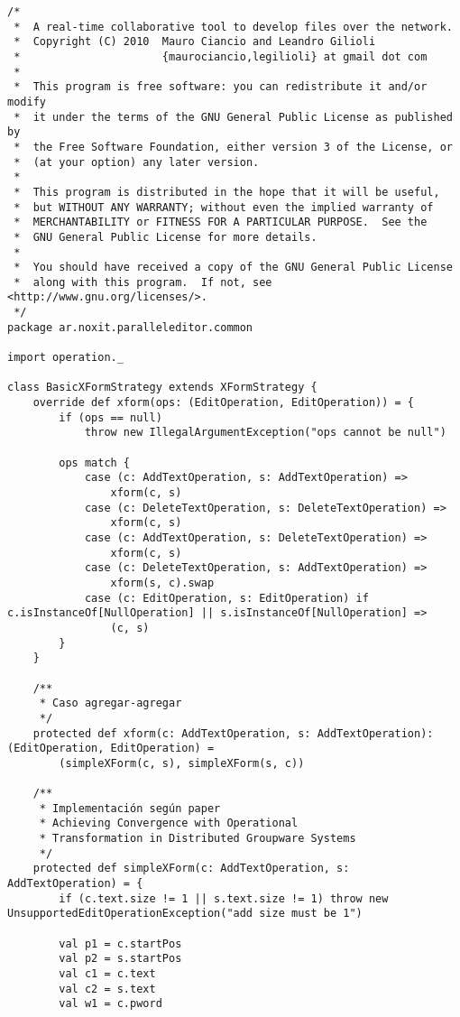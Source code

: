{
\tiny
\begin{verbatim}
/*
 *  A real-time collaborative tool to develop files over the network.
 *  Copyright (C) 2010  Mauro Ciancio and Leandro Gilioli
 *                      {maurociancio,legilioli} at gmail dot com
 *
 *  This program is free software: you can redistribute it and/or modify
 *  it under the terms of the GNU General Public License as published by
 *  the Free Software Foundation, either version 3 of the License, or
 *  (at your option) any later version.
 *
 *  This program is distributed in the hope that it will be useful,
 *  but WITHOUT ANY WARRANTY; without even the implied warranty of
 *  MERCHANTABILITY or FITNESS FOR A PARTICULAR PURPOSE.  See the
 *  GNU General Public License for more details.
 *
 *  You should have received a copy of the GNU General Public License
 *  along with this program.  If not, see <http://www.gnu.org/licenses/>.
 */
package ar.noxit.paralleleditor.common

import operation._

class BasicXFormStrategy extends XFormStrategy {
    override def xform(ops: (EditOperation, EditOperation)) = {
        if (ops == null)
            throw new IllegalArgumentException("ops cannot be null")

        ops match {
            case (c: AddTextOperation, s: AddTextOperation) =>
                xform(c, s)
            case (c: DeleteTextOperation, s: DeleteTextOperation) =>
                xform(c, s)
            case (c: AddTextOperation, s: DeleteTextOperation) =>
                xform(c, s)
            case (c: DeleteTextOperation, s: AddTextOperation) =>
                xform(s, c).swap
            case (c: EditOperation, s: EditOperation) if c.isInstanceOf[NullOperation] || s.isInstanceOf[NullOperation] =>
                (c, s)
        }
    }

    /**
     * Caso agregar-agregar
     */
    protected def xform(c: AddTextOperation, s: AddTextOperation): (EditOperation, EditOperation) =
        (simpleXForm(c, s), simpleXForm(s, c))

    /**
     * Implementación según paper
     * Achieving Convergence with Operational
     * Transformation in Distributed Groupware Systems
     */
    protected def simpleXForm(c: AddTextOperation, s: AddTextOperation) = {
        if (c.text.size != 1 || s.text.size != 1) throw new UnsupportedEditOperationException("add size must be 1")

        val p1 = c.startPos
        val p2 = s.startPos
        val c1 = c.text
        val c2 = s.text
        val w1 = c.pword


\end{verbatim}}
